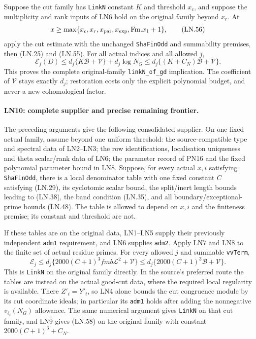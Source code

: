 Suppose the cut family has \texttt{LinkN} constant $K$ and
threshold $x_c$, and suppose the multiplicity and rank inputs of
LN6 hold on the original family beyond $x_r$.  At
\[
 x\ge\max\{x_c,x_r,x_{\rm par},x_{\rm exp},
                                      \mathrm{Fm}.x_1+1\},
 \tag{LN.56}
\]
apply the cut estimate with the unchanged \texttt{ShaFinOdd} and
summability premises, then (LN.25) and (LN.55).  For all actual
indices and all allowed $j$,
\[
 \mathcal E_j(D)
 \le d_j\{K\mathcal B+\mathcal V\}+d_j\log N_G
 \le d_j\{(K+C_N)\mathcal B+\mathcal V\}.
 \tag{LN.57}
\]
This proves the complete original-family
\texttt{linkN\_of\_gd} implication.  The coefficient of
$\mathcal V$ stays exactly $d_j$; restoration costs only the
explicit polynomial budget, and never a new cohomological factor.

\paragraph{LN10: complete supplier and precise remaining frontier.}
\label{claim:LN10}
The preceding arguments give the following consolidated supplier.
On one fixed actual family, assume beyond one uniform threshold:
the source-compatible type and spectral data of LN2--LN3; the
row identifications, localisation uniqueness and theta scalar/rank
data of LN6; the parameter record of PN16 and the fixed polynomial
parameter bound in LN8.  Suppose, for every actual $x,i$ satisfying
\texttt{ShaFinOdd}, there is a local denominator table with one
fixed constant $C$ satisfying (LN.29), its cyclotomic scalar bound,
the split/inert length bounds leading to (LN.38), the band condition
(LN.35), and all boundary/exceptional-prime bounds (LN.48).
The table is allowed to depend on $x,i$ and the finiteness premise;
its constant and threshold are not.

If these tables are on the original data, LN1--LN5 supply their
previously independent \texttt{adm1} requirement, and LN6 supplies
\texttt{adm2}.  Apply LN7 and LN8 to the finite set of actual
residue primes.  For every allowed $j$ and summable
\texttt{vvTerm},
\[
 \mathcal E_j\le d_j\{2000(C+1)^3fmb\mathcal L^2+\mathcal V\}
       \le d_j\{2000(C+1)^3\mathcal B+\mathcal V\}.
 \tag{LN.58}
\]
This is \texttt{LinkN} on the original family directly.  In the
source's preferred route the tables are instead on the actual
good-cut data, where the required local regularity is available.
There $Z'_i=Y'_i$, so LN4 alone bounds the cut congruence module
by its cut coordinate ideals; in particular its \texttt{adm1}
holds after adding the nonnegative $v_{\ell_i}(N_G)$ allowance.
The same numerical argument gives \texttt{LinkN} on that cut
family, and LN9 gives (LN.58) on the original family with constant
$2000(C+1)^3+C_N$.

